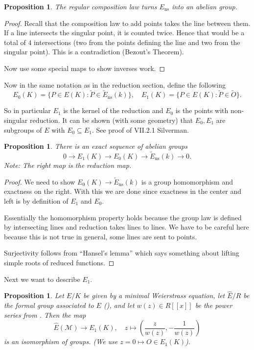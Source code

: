 \documentclass[11pt]{article}
\newcommand{\script}[1]{\mathcal{#1}} %
\newcommand{\st}{\colon}
\newcommand{\ns}{\operatorname{ns}}
\theoremstyle{plain}%
\newtheorem{prop}[thm]{Proposition}
\theoremstyle{definition}
\theoremstyle{remark}
\begin{document}
\begin{prop} %
	The regular composition law turns $E_{\ns}$ into an abelian group.
\end{prop}
\begin{proof}
	Recall that the composition law to add points takes the line between them. If a line intersects the singular point, it is counted twice. Hence that would be a total of $4$ intersections (two from the points defining the line and two from the singular point). This is a contradiction (Bezout's Theorem).
	
	Now use some special maps to show inverses work.
\end{proof}

Now in the same notation as in the reduction section, define the following
$$
E_0(K) = \{P\in E(K) \st \tilde{P}\in \tilde{E}_{\ns}(k)\}
,\quad
E_1(K) = \{P\in E(K) \st \tilde{P}\in \tilde{O}\}.
$$

So in particular $E_1$ is the kernel of the reduction and $E_0$ is the points with non-singular reduction. It can be shown (with some geometry) that $E_0,E_1$ are subgroups of $E$ with $E_0\subseteq E_1$. See proof of VII.2.1 Silverman.

\begin{prop} %
	There is an exact sequence of abelian groups
	$$
	0 \to E_1(K) \to E_0(K) \to \tilde{E}_{\ns}(k) \to 0.
	$$
	Note: The right map is the reduction map.
\end{prop}
\begin{proof}
	We need to show $E_0(K)\to\tilde{E}_{\ns}(k)$ is a group homomorphism and exactness on the right. With this we are done since exactness in the center and left is by definition of $E_1$ and $E_0$.

	Essentially the homomorphism property holds because the group law is defined by intersecting lines and reduction takes lines to lines. We have to be careful here because this is not true in general, some lines are sent to points.

	Surjectivity follows from ``Hansel's lemma'' which says something about lifting simple roots of reduced functions.
\end{proof}

Next we want to describe $E_1$.

\begin{prop} %
	Let $E/K$ be given by a minimal Weierstrass equation, let $\hat{E}/R$ be the formal group associated to $E$ (\cite[IV.2.2.3]{silverman1}), and let $w(z)\in R[[x]]$ be the power series from \cite[IV.1.1]{silverman1}. Then the map
	$$
	\hat{E}(\script{M}) \to E_1(K),\quad
	z\mapsto\left(\frac{z}{w(z)},-\frac{1}{w(z)}\right)
	$$
	is an isomorphism of groups. (We use $z=0 \mapsto O\in E_1(K)$).
\end{prop}
\end{document}
